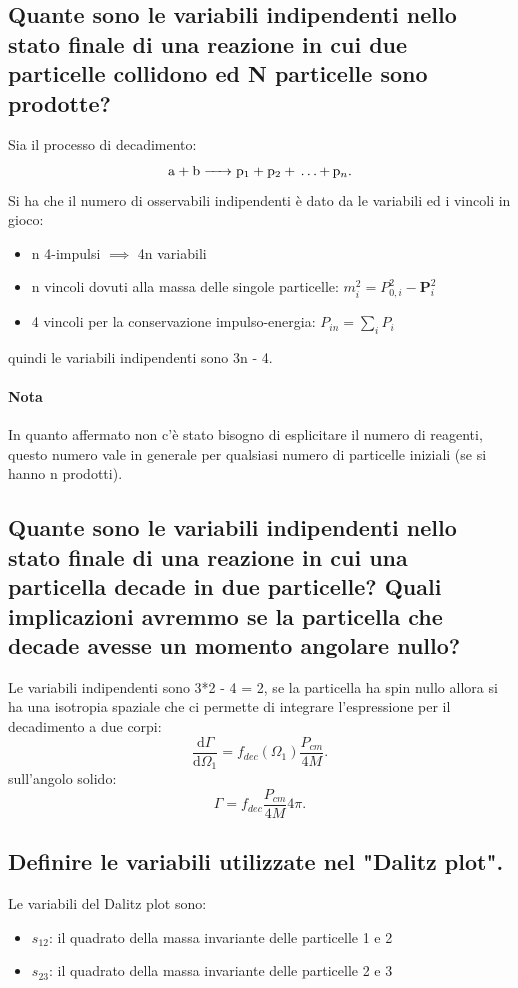 \subsection[$\ $ Variabili indipendenti con due reagenti e N prodotti]{Quante sono le variabili indipendenti nello stato finale di una reazione in cui due particelle collidono ed N particelle sono prodotte?}
Sia il processo di decadimento:
\[
	\ce{a + b -> p_1 + p_2 + \ldots \text{+} p_n }
.\] 
Si ha che il numero di osservabili indipendenti è dato da le variabili ed i vincoli in gioco:
\begin{itemize}
	\item n 4-impulsi $\implies$ 4n variabili
	\item n vincoli dovuti alla massa delle singole particelle: $m_i^2 = P_{0, i}^2 - \boldsymbol{P}_{i}^2$
	\item 4 vincoli per la conservazione impulso-energia: $P_{in} = \sum_i P_i$
\end{itemize}
quindi le variabili indipendenti sono 3n - 4.
\paragraph{Nota}%
In quanto affermato non c'è stato bisogno di esplicitare il numero di reagenti, questo numero vale in generale per qualsiasi numero di particelle iniziali (se si hanno n prodotti).

\subsection[$\ $ Variabili indipendenti per un decadimento a due, considerazioni sul caso di Spin nullo]{Quante sono le variabili indipendenti nello stato finale di una reazione in cui una particella decade in due particelle? Quali implicazioni avremmo se la particella che decade avesse un momento angolare nullo? }
Le variabili indipendenti sono 3*2 - 4 = 2, se la particella ha spin nullo allora si ha una isotropia spaziale che ci permette di integrare l'espressione per il decadimento a due corpi:
\[
	\frac{\mbox{d} \Gamma}{\mbox{d} \Omega_1} = f_{dec}\left( \Omega_1 \right) \frac{P_{cm}}{4M} 
.\] 
sull'angolo solido:
\[
	\Gamma = f_{dec} \frac{P_{cm}}{4M}4\pi
.\] 

\subsection[$\ $ Variabili del Dalitz Plot]{Definire le variabili utilizzate nel "Dalitz plot".}
Le variabili del Dalitz plot sono:
\begin{itemize}
	\item $s_{12}$: il quadrato della massa invariante delle particelle 1 e 2
	\item $s_{23}$: il quadrato della massa invariante delle particelle 2 e 3
\end{itemize}

